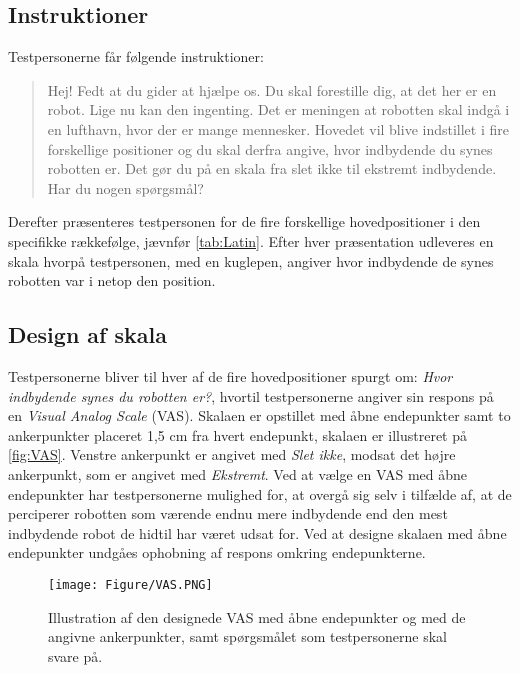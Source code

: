 \subsection*{Instruktioner}
\label{Instruktioner}
%
Testpersonerne får følgende instruktioner: 
%
\begin{quotation}
\noindent
Hej!\blankline
%
Fedt at du gider at hjælpe os. Du skal forestille dig, at det her er en robot. Lige nu kan den ingenting. Det er meningen at robotten skal indgå i en lufthavn, hvor der er mange mennesker. Hovedet vil blive indstillet i fire forskellige positioner og du skal derfra angive, hvor indbydende du synes robotten er. Det gør du på en skala fra slet ikke til ekstremt indbydende.\blankline
%
Har du nogen spørgsmål?
\end{quotation}
%
Derefter præsenteres testpersonen for de fire forskellige hovedpositioner i den specifikke rækkefølge, jævnfør \autoref{tab:Latin}. Efter hver præsentation udleveres en skala hvorpå testpersonen, med en kuglepen, angiver hvor indbydende de synes robotten var i netop den position.  
%

\subsection*{Design af skala}
%
Testpersonerne bliver til hver af de fire hovedpositioner spurgt om: \textit{Hvor indbydende synes du robotten er?}, hvortil testpersonerne angiver sin respons på en \textit{Visual Analog Scale} (VAS). Skalaen er opstillet med åbne endepunkter samt to ankerpunkter placeret 1,5 cm fra hvert endepunkt, skalaen er illustreret på \autoref{fig:VAS}. Venstre ankerpunkt er angivet med \textit{Slet ikke}, modsat det højre ankerpunkt, som er angivet med \textit{Ekstremt}. Ved at vælge en VAS med åbne endepunkter har testpersonerne mulighed for, at overgå sig selv i tilfælde af, at de perciperer robotten som værende endnu mere indbydende end den mest indbydende robot de hidtil har været udsat for. Ved at designe skalaen med åbne endepunkter undgåes ophobning af respons omkring endepunkterne. 
%
\begin{figure}[H]
\centering
\texttt{[image: Figure/VAS.PNG]} 
\caption{Illustration af den designede VAS med åbne endepunkter og med de angivne ankerpunkter, samt spørgsmålet som testpersonerne skal svare på.}
\label{fig:VAS}
\end{figure}
\noindent 
%










